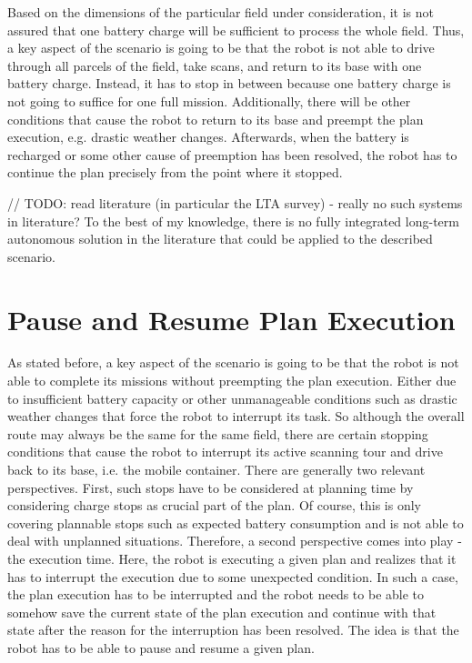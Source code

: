 \documentclass[german, master, expose, latin1]{base/thesis_KBS}
\begin{document}
Based on the dimensions of the particular field under consideration, it is not assured that one battery charge will be sufficient to process the whole field.
Thus, a key aspect of the scenario is going to be that the robot is not able to drive through all parcels of the field, take scans, and return to its base with one battery charge.
Instead, it has to stop in between because one battery charge is not going to suffice for one full mission. Additionally, there will be other conditions that cause
the robot to return to its base and preempt the plan execution, e.g. drastic weather changes. Afterwards, when the battery is recharged or some other cause of preemption
has been resolved, the robot has to continue the plan precisely from the point where it stopped.\newline

// TODO: read literature (in particular the LTA survey) - really no such systems in literature?
To the best of my knowledge, there is no fully integrated long-term autonomous solution in the literature that could be applied to the described scenario.

\section{Pause and Resume Plan Execution}

As stated before, a key aspect of the scenario is going to be that the robot is not able to complete its missions without preempting the plan execution.
Either due to insufficient battery capacity or other unmanageable conditions such as drastic weather changes that force the robot to interrupt its task.
So although the overall route may always be the same for the same field, there are certain stopping conditions that cause the robot to interrupt its 
active scanning tour and drive back to its base, i.e. the mobile container.
There are generally two relevant perspectives. First, such stops have to be considered at planning time by considering charge stops as crucial part of the plan.
Of course, this is only covering plannable stops such as expected battery consumption and is not able to deal with unplanned situations.
Therefore, a second perspective comes into play - the execution time. Here, the robot is executing a given plan and realizes that it has to interrupt the execution
due to some unexpected condition. In such a case, the plan execution has to be interrupted and the robot needs to be able to somehow save the current state of the plan
execution and continue with that state after the reason for the interruption has been resolved.
The idea is that the robot has to be able to pause and resume a given plan.\newline
\end{document}
